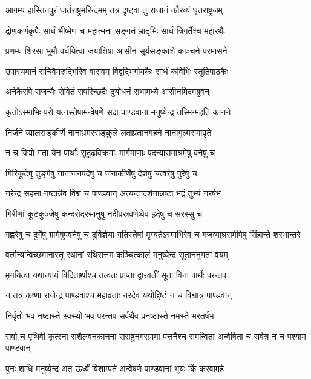 \twolineshloka
{आगम्य हास्तिनपुरं धार्तराष्ट्रमरिन्दमम्}
{तत्र दृष्ट्वा तु राजानं कौरव्यं धृतराष्ट्रजम्}


\twolineshloka
{द्रोणकर्णकृपैः सार्धं भीष्मेण च महात्मना}
{सङ्गतं भ्रातृभिः सार्धं त्रिगर्तैश्च महारथैः}


\twolineshloka
{प्रणम्य शिरसा भूमौ वर्धयित्वा जयाशिषा}
{आसीनं सूर्यसङ्काशे काञ्चने परमासने}


\twolineshloka
{उपास्यमानं सचिवैर्मरुद्भिरिव वासवम्}
{विद्वद्भिर्गायकैः सार्धं कविभिः स्तुतिपाठकैः}


\twolineshloka
{अनेकैरपि राजन्यैः सेवितं सपरिच्छदैः}
{दुर्योधनं सभामध्ये आसीनमिदमब्रुवन्}


\twolineshloka
{कृतोऽस्माभिः परो यत्नस्तेषामन्वेषणे सदा}
{पाण्डवानां मनुष्येन्द्र तस्मिन्महति कानने}


\twolineshloka
{निर्जने व्यालसङ्कीर्णे नानाभ्रमरसङ्कुले}
{लताप्रतानगहने नानागुल्मसमावृते}


\twolineshloka
{न च विद्मो गता येन पार्थाः सुदृढविक्रमाः}
{मार्गमाणाः पदन्यासमाश्रमेषु वनेषु च}


\twolineshloka
{गिरिकूटेषु तुङ्गेषु नानाजनपदेषु च}
{जनाकीर्णेषु देशेषु चत्वरेषु पुरेषु च}


\twolineshloka
{नरेन्द्र सहसा नष्टान्नैव विद्म च पाण्डवान्}
{अत्यन्तादर्शनान्नष्टा भद्रं तुभ्यं नरर्षभ}


\twolineshloka
{गिरीणां कूटकुञ्जेषु कन्दरोदरसानुषु}
{नदीप्रस्रवणेष्वेव ह्रदेषु च सरस्सु च}


\threelineshloka
{गह्वरेषु च दुर्गेषु ग्रामेषूपवनेषु च}
{दुर्विज्ञेया गतिस्तेषां मृग्यतेऽस्माभिरेव च}
{गजव्याघ्रसमीपेषु सिंहान्ते शरभान्तरे}


\twolineshloka
{वर्त्मन्यन्विच्छमानास्तु रथानां रथिसत्तम}
{कञ्चित्कालं मनुष्येन्द्र सूताननुगता वयम्}


\twolineshloka
{मृगयित्वा यथान्यायं विदितार्थाश्च तत्वतः}
{प्राप्ता द्वारवतीं सूता विना पार्थैः परन्तप}


\twolineshloka
{न तत्र कृष्णा राजेन्द्र पाण्डवाश्च महाव्रताः}
{नरदेव यथोद्दिष्टं न च विद्मात्र पाण्डवान्}


\twolineshloka
{निर्वृतो भव नष्टास्ते स्वस्थो भव परन्तप}
{सर्वथैव प्रनष्टास्ते नमस्ते भरतर्षभ}


\threelineshloka
{सर्वा च पृथिवी कृत्स्ना सशैलवनकानना}
{सराष्ट्रनगरग्रामा पत्तनैश्च समन्विता}
{अन्वेषिता च सर्वत्र न च पश्याम पाण्डवान्}


\twolineshloka
{पुनः शाधि मनुष्येन्द्र अत ऊर्ध्वं विशाम्पते}
{अन्वेषणे पाण्डवानां भूयः किं करवामहे}


